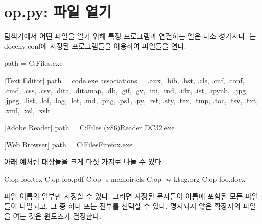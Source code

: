 
\section{op.py: 파일 열기}

탐색기에서 어떤 파일을 열기 위해 특정 프로그램과 연결하는 일은 다소 성가시다.
는 docenv.conf에 지정된 프로그램들을 이용하여 파일들을 연다.

\begin{codewrite}
[SumatraPDF]
path = C:\Program Files\SumatraPDF\SumatraPDF.exe

[Text Editor]
path = code.exe
associations = .aux, .bib, .bst, .cls, .cnf, .conf, .cmd, .css, .csv, .dita, .ditamap, .db, .gif, .gv, .ini, .ind, .idx, .ist, .ipynb, ,.jpg, .jpeg, .list, .lof, .log, .lot, .md, .png, .ps1, .py, .rst, .sty, .tex, .tmp, .toc, .tsv, .txt, .xml, .xsl, .xslt

[Adobe Reader]
path = C:\Program Files (x86)\Adobe\Acrobat Reader DC\Reader\AcroRd32.exe

[Web Browser]
path = C:\Program Files\Mozilla Firefox\firefox.exe
\end{codewrite}
\coderead[language=ini] 

아래 예처럼 대상들을 크게 다섯 가지로 나눌 수 있다.

\begin{code}
C:\>op foo.tex
C:\>op foo.pdf
C:\>op -s memoir.cls 
C:\>op -w ktug.org
C:\>op foo.docx
\end{code}

파일 이름의 일부만 지정할 수 있다. 그러면 지정된 문자들이 이름에 포함된 모든 파일들이 나열되고, 그 중 하나 또는 전부를 선택할 수 있다.
명시되지 않은 확장자의 파일을 여는 것은 윈도즈가 결정한다.

